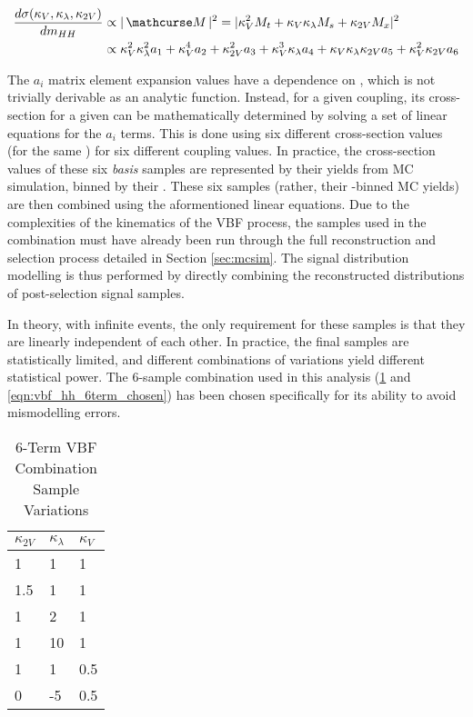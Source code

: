     \begin{equation} \begin{split} \label{eq:tree_level_invamp_simple}
        \dXsecM &\propto |\invAmp|^2 = |  \kv^2 M_t + \kv \kl M_s + \kvv M_x |^2 \\
        &\propto \kv^2 \kl^2 a_1 + \kv^4 a_2 + \kvv^2 a_3 + \kv^3 \kl a_4 + \kv \kl \kvv a_5 + \kv^2 \kvv a_6
    \end{split} \end{equation}

    The $a_i$ matrix element expansion values have a dependence on \mhh, which is not trivially derivable as an analytic function.
    Instead, for a given coupling, its cross-section for a given \mhh can be mathematically determined by solving a set of linear equations for the $a_i$ terms.
    This is done using six different cross-section values (for the same \mhh) for six different coupling values.
    In practice, the cross-section values of these six \textit{basis} samples are represented by their yields from MC simulation, binned by their \mhh.
    These six samples (rather, their \mhh-binned MC yields) are then combined using the aformentioned linear equations.
    Due to the complexities of the kinematics of the VBF process,
        the samples used in the combination must have already been run through the full reconstruction and selection process detailed in Section \ref{sec:mcsim}.
    The signal distribution modelling is thus performed by directly combining the reconstructed \mhh distributions of post-selection signal samples.

    In theory, with infinite events, the only requirement for these samples is that they are linearly independent of each other.
    In practice, the final samples are statistically limited, and different combinations of variations yield different statistical power.
    The 6-sample combination used in this analysis (\ref{tab:vbf_hh_6term_varlist} and \ref{eqn:vbf_hh_6term_chosen}) has been chosen specifically for its ability to avoid mismodelling errors.

    \begin{table}[] \centering
    \caption{6-Term VBF Combination Sample Variations}
    \label{tab:vbf_hh_6term_varlist}
    \begin{tabular}{ |l|l|l| }
        \hline
        \textbf {$\kappa_{2V}$} & \textbf {$\kappa_\lambda$} & \textbf {$\kappa_V$} \\
        \hline
            1   &   1 & 1   \\
            1.5 &   1 & 1   \\
            1   &   2 & 1   \\
            1   &  10 & 1   \\
            1   &   1 & 0.5 \\
            0   &  -5 & 0.5 \\
        \hline
    \end{tabular} \end{table}

